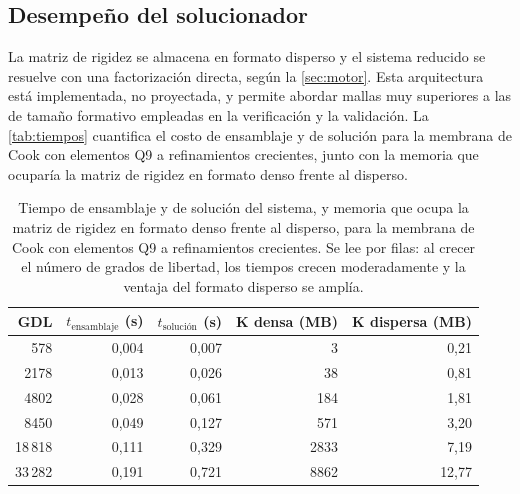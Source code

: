 \subsection{Desempeño del solucionador}

La matriz de rigidez se almacena en formato disperso y el sistema reducido se resuelve con una factorización directa, según la \autoref{sec:motor}. Esta arquitectura está implementada, no proyectada, y permite abordar mallas muy superiores a las de tamaño formativo empleadas en la verificación y la validación. La \autoref{tab:tiempos} cuantifica el costo de ensamblaje y de solución para la membrana de Cook con elementos Q9 a refinamientos crecientes, junto con la memoria que ocuparía la matriz de rigidez en formato denso frente al disperso.

\begin{table}[htbp]
\centering
\caption[Tiempos de ensamblaje y solución, y memoria de la matriz de rigidez (Cook Q9).]{Tiempo de ensamblaje y de solución del sistema, y memoria que ocupa la matriz de rigidez en formato denso frente al disperso, para la membrana de Cook con elementos Q9 a refinamientos crecientes. Se lee por filas: al crecer el número de grados de libertad, los tiempos crecen moderadamente y la ventaja del formato disperso se amplía.}
\label{tab:tiempos}
\begin{tabular}{r r r r r}
\toprule
GDL & $t_{\text{ensamblaje}}$ (s) & $t_{\text{solución}}$ (s) & $\bm{K}$ densa (MB) & $\bm{K}$ dispersa (MB) \\
\midrule
578   & 0,004 & 0,007 & 3    & 0,21  \\
2178  & 0,013 & 0,026 & 38   & 0,81  \\
4802  & 0,028 & 0,061 & 184  & 1,81  \\
8450  & 0,049 & 0,127 & 571  & 3,20  \\
18\,818 & 0,111 & 0,329 & 2833 & 7,19  \\
33\,282 & 0,191 & 0,721 & 8862 & 12,77 \\
\bottomrule
\end{tabular}
{\singlespacing{}}
\end{table}

